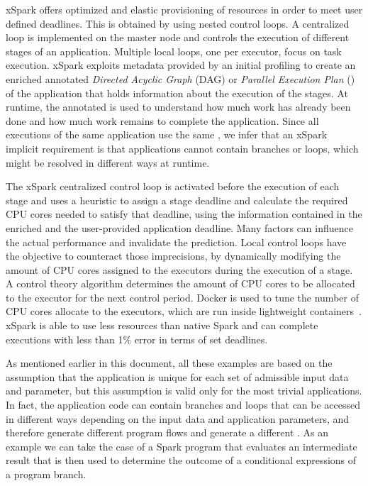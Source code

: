 xSpark offers optimized and elastic provisioning of resources in order to meet user defined deadlines. This is obtained by using nested control loops. A centralized loop is implemented on the master node and controls the execution of different stages of an application. Multiple local loops, one per executor, focus on task execution. xSpark exploits metadata provided by an initial profiling to create an enriched annotated \textit{Directed Acyclic Graph} (DAG) or \textit{Parallel Execution Plan} (\plan) of the application that holds information about the execution of the stages. At runtime, the annotated \plan is used to understand how much work has already been done and how much work remains to complete the application. Since all executions of the same application use the same \plan, we infer that an xSpark implicit requirement is that applications cannot contain branches or loops, which might be resolved in different ways at runtime. 

The xSpark centralized control loop is activated before the execution of each stage and uses a heuristic to assign a stage deadline and calculate the required CPU cores needed to satisfy that deadline, using the information contained in the enriched \plan and the user-provided  application deadline. Many factors can influence the actual performance and invalidate the prediction. Local control loops have the objective to counteract those imprecisions, by dynamically modifying the amount of CPU cores assigned to the executors during the execution of a stage. A control theory algorithm determines the amount of CPU cores to be allocated to the executor for the next control period. Docker is used to tune the number of CPU cores allocate to the executors, which are run inside lightweight containers~\cite{misc:Docker}. xSpark is able to use less resources than native Spark and can complete executions with less than 1\% error in terms of set deadlines.


As mentioned earlier in this document, all these examples are based on the assumption that the application \plan is unique for each set of admissible input data and parameter, but this assumption is valid only for the most trivial applications. In fact, the application code can contain branches and loops that can be accessed in different ways depending on the input data and application parameters, and therefore generate different program flows and generate a different \plan. As an example we can take the case of a Spark program that evaluates an intermediate result that is then used to determine the outcome of a conditional expressions of a program branch.

